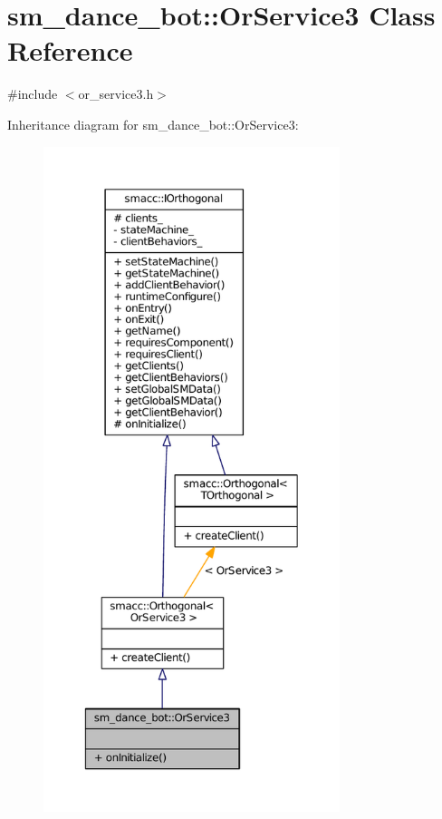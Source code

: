 \hypertarget{classsm__dance__bot_1_1OrService3}{}\section{sm\+\_\+dance\+\_\+bot\+:\+:Or\+Service3 Class Reference}
\label{classsm__dance__bot_1_1OrService3}


{\ttfamily \#include $<$or\+\_\+service3.\+h$>$}



Inheritance diagram for sm\+\_\+dance\+\_\+bot\+:\+:Or\+Service3\+:
\nopagebreak
\begin{figure}[H]
\begin{center}
\leavevmode
\includegraphics[height=550pt]{classsm__dance__bot_1_1OrService3__inherit__graph}
\end{center}
\end{figure}


